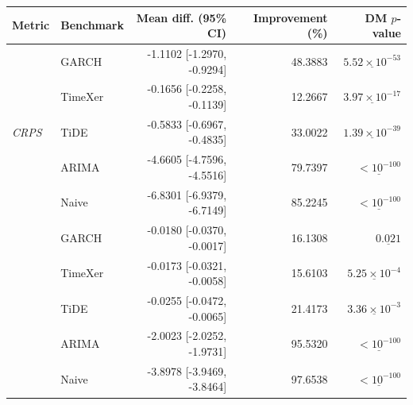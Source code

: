 \begin{tabular}{llrrr}
\toprule
Metric & Benchmark & Mean diff. (95\% CI) & Improvement (\%) & DM $p$-value \\
\midrule
\multirow{5}{*}{\textit{CRPS}}
 & GARCH & -1.1102 [-1.2970, -0.9294] & 48.3883 & $\underline{5.52 \times 10^{-53}}$ \\
 & TimeXer & -0.1656 [-0.2258, -0.1139] & 12.2667 & $\underline{3.97 \times 10^{-17}}$ \\
 & TiDE & -0.5833 [-0.6967, -0.4835] & 33.0022 & $\underline{1.39 \times 10^{-39}}$ \\
 & ARIMA & -4.6605 [-4.7596, -4.5516] & 79.7397 & $\underline{< 10^{-100}}$ \\
 & Naive & -6.8301 [-6.9379, -6.7149] & 85.2245 & $\underline{< 10^{-100}}$ \\
\addlinespace \midrule
\multirow{5}{*}{\textit{twCRPS}}
 & GARCH & -0.0180 [-0.0370, -0.0017] & 16.1308 & $\underline{0.021}$ \\
 & TimeXer & -0.0173 [-0.0321, -0.0058] & 15.6103 & $\underline{5.25 \times 10^{-4}}$ \\
 & TiDE & -0.0255 [-0.0472, -0.0065] & 21.4173 & $\underline{3.36 \times 10^{-3}}$ \\
 & ARIMA & -2.0023 [-2.0252, -1.9731] & 95.5320 & $\underline{< 10^{-100}}$ \\
 & Naive & -3.8978 [-3.9469, -3.8464] & 97.6538 & $\underline{< 10^{-100}}$ \\
\bottomrule
\end{tabular}